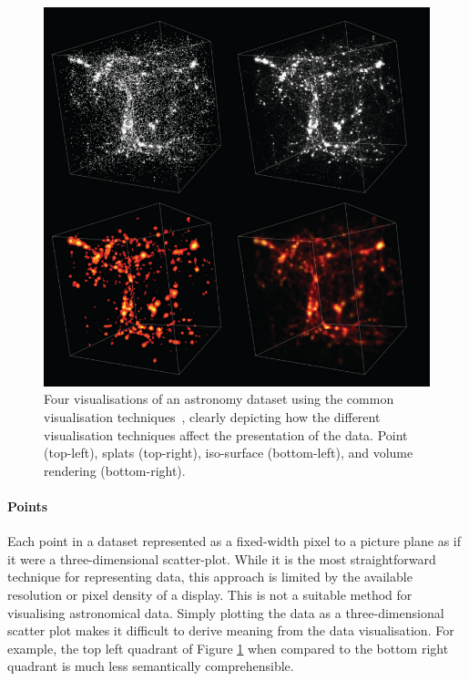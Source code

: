 \begin{figure}[h]
    \centering
    \includegraphics[width=\linewidth]{figures/visualisation.png}
    \caption{Four visualisations of an astronomy dataset using the common visualisation techniques~\cite{Hassan2011}, clearly depicting how the different visualisation techniques affect the presentation of the data. Point (top-left), splats (top-right), iso-surface (bottom-left), and volume rendering (bottom-right).}
    \label{fig:visualisation}
\end{figure}

\paragraph{Points}
Each point in a dataset represented as a fixed-width pixel to a picture plane as if it were a three-dimensional scatter-plot.
While it is the most straightforward technique for representing data, this approach is limited by the available resolution or pixel density of a display.
This is not a suitable method for visualising astronomical data.
Simply plotting the data as a three-dimensional scatter plot makes it difficult to derive meaning from the data visualisation.
For example, the top left quadrant of Figure \ref{fig:visualisation} when compared to the bottom right quadrant is much less semantically comprehensible.

